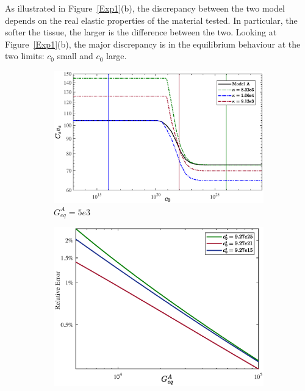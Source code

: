 \documentclass[runningheads]{llncs}
\begin{document}
As illustrated in Figure~\ref{Exp1}(b), the discrepancy between the two model depends on the real elastic properties of the material tested. In particular, the softer the tissue, the larger is the difference between the two. Looking at Figure~\ref{Exp1}(b), the major discrepancy is in the equilibrium behaviour at the two limits: $c_0$ small and $c_0$ large. 
\begin{figure}
	\begin{subfigure}{0.6\textwidth}
		\includegraphics[scale=0.36]{images/freeswel1}
		\caption{$G^A_{eq}=5e3$}
	\end{subfigure}
	\begin{subfigure}{0.39\textwidth}
		\hspace{-8mm}
		\includegraphics[scale=0.36]{images/freeswel2}
		\caption{}
	\end{subfigure}

\end{figure}
\end{document}
